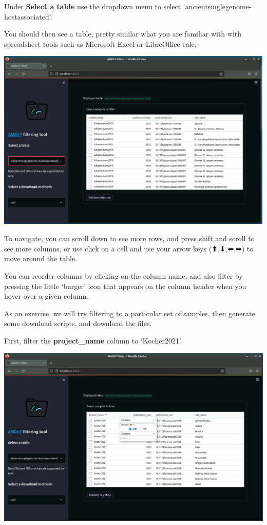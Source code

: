 \documentclass[
  letterpaper,
]{book}
\begin{document}
Under \textbf{Select a table} use the dropdown menu to select
`ancientsinglegenome-hostassociated'.

You should then see a table, pretty similar what you are familiar with
with spreadsheet tools such as Microsoft Excel or LibreOffice calc.

\includegraphics{assets/images/chapters/introduction-to-ancientmetagenomedir/amdirt-projectfilter.png}

To navigate, you can scroll down to see more rows, and press shift and
scroll to see more columns, or use click on a cell and use your arrow
keys (⬆,⬇,⬅,➡) to move around the table.

You can reorder columns by clicking on the column name, and also filter
by pressing the little `burger' icon that appears on the column header
when you hover over a given column.

As an exercise, we will try filtering to a particular set of samples,
then generate some download scripts, and download the files.

First, filter the \textbf{project\_name} column to `Kocher2021'.

\includegraphics{assets/images/chapters/introduction-to-ancientmetagenomedir/amdirt-projectfilter2.png}
\end{document}
